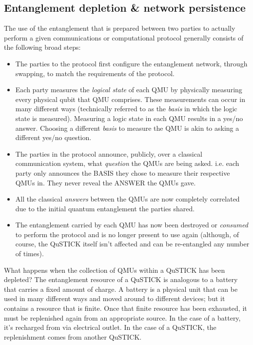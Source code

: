 \documentclass[twocolumn, aps, rmp, amsmath, amssymb, nofootinbib, superscriptaddress, longbibliography, floatfix, table-of-contents, eqsecnum]{revtex4-2}
\begin{document}
\subsection{Entanglement depletion \& network persistence}

The use of the entanglement that is prepared between two parties to actually perform a given communications or computational protocol generally consists of the following broad steps: 
\begin{itemize}
\item The parties to the protocol first configure the entanglement network, through swapping, to match the requirements of the protocol.
\item Each party measures the \textit{logical state} of each QMU by physically measuring every physical qubit that QMU comprises. These measurements can occur in many different ways (technically referred to as the \textit{basis} in which the logic state is measured). Measuring a logic state in each QMU results in a yes/no answer. Choosing a different \textit{basis} to measure the QMU is akin to asking a different yes/no question. 
\item The parties in the protocol announce, publicly, over a classical communication system, what \textit{question} the QMUs are being asked. i.e. each party only announces the BASIS they chose to measure their respective QMUs in. They never reveal the ANSWER the QMUs gave. 
\item All the classical \textit{answers} between the QMUs are now completely correlated due to the initial quantum entanglement the parties shared. 
\item The entanglement carried by each QMU has now been destroyed or \textit{consumed} to perform the protocol and is no longer present to use again (although, of course, the QuSTICK itself isn't affected and can be re-entangled any number of times). 
\end{itemize}

What happens when the collection of QMUs within a QuSTICK has been depleted? The entanglement resource of a QuSTICK is analogous to a battery that carries a fixed amount of charge. A battery is a physical unit that can be used in many different ways and moved around to different devices; but it contains a resource that is finite. Once that finite resource has been exhausted, it must be replenished again from an appropriate source. In the case of a battery, it's recharged from via electrical outlet. In the case of a QuSTICK, the replenishment comes from another QuSTICK.
\end{document}
